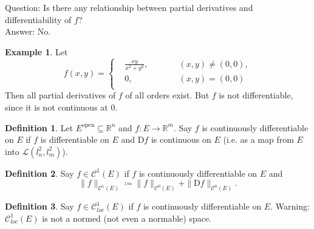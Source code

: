 \documentclass[12pt]{article}
\theoremstyle{plain}
\theoremstyle{definition}
\newtheorem*{defn}{Definition}
\newtheorem*{eg}{Example}
\begin{document}
Question: Is there any relationship between partial derivatives and differentiability of $f$?\\
Answer: No.

\begin{eg}
    Let 
    \[
        f(x, y) = \left\{
            \begin{aligned}
                &\frac{xy}{x^2+y^2},\qquad&&(x,y)\neq(0,0),\\
                &0,&&(x,y) = (0,0)\\
            \end{aligned}
        \right.
    \]
    Then all partial derivatives of $f$ of all orders exist.
    But $f$ is not differentiable, since it is not continuous at $0$.
\end{eg}

\begin{defn}
    Let $E^{\text{open}}\subseteq \mathbb{R}^n$ and $f : E\rightarrow \mathbb{R}^m$.
    Say $f$ is continuously differentiable on $E$ if $f$ is differentiable on $E$ and $\mathrm{D}f$ is continuous on $E$ (i.e. as a map from $E$ into
    $\mathcal{L}(l_n^2, l_m^2)$).
\end{defn}
\begin{defn}
    Say $f\in \mathcal{C}^1(E)$ if $f$ is continuously differentiable on $E$ and
    \[
        \|f\|_{\mathcal{C}^1(E)} \coloneqq \|f\|_{\mathcal{C}^0(E)} + \|\mathrm{D}f\|_{\mathcal{C}^0(E)}.
    \]
\end{defn}
\begin{defn}
    Say $f \in \mathcal{C}_{loc}^1(E)$ if $f$ is continuously differentiable on $E$.
    Warning: $\mathcal{C}_{loc}^1(E)$ is not a normed (not even a normable) space.
\end{defn}
\end{document}
